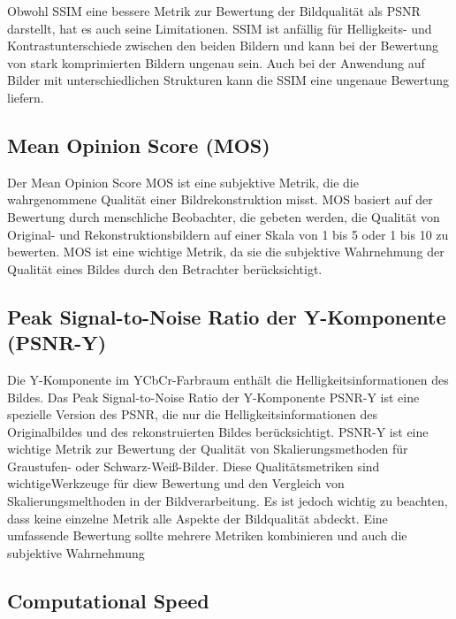             Obwohl \ac{SSIM} eine bessere Metrik zur Bewertung der Bildqualität als \ac{PSNR} darstellt, hat es auch seine Limitationen.
            \ac{SSIM} ist anfällig für Helligkeits- und Kontrastunterschiede zwischen den beiden Bildern und kann bei der Bewertung von stark komprimierten Bildern ungenau sein.
            Auch bei der Anwendung auf Bilder mit unterschiedlichen Strukturen kann die \ac{SSIM} eine ungenaue Bewertung liefern.
    \subsection{Mean Opinion Score (MOS)}
        Der Mean Opinion Score \ac{MOS} ist eine subjektive Metrik, die die wahrgenommene Qualität einer Bildrekonstruktion misst.
        MOS basiert auf der Bewertung durch menschliche Beobachter, die gebeten werden, die Qualität von Original- und Rekonstruktionsbildern auf einer Skala von 1 bis 5 oder 1 bis 10 zu bewerten.
        MOS ist eine wichtige Metrik, da sie die subjektive Wahrnehmung der Qualität eines Bildes durch den Betrachter berücksichtigt.
        
    \subsection{Peak Signal-to-Noise Ratio der Y-Komponente (PSNR-Y)}
        Die Y-Komponente im YCbCr-Farbraum enthält die Helligkeitsinformationen des Bildes. 
        Das Peak Signal-to-Noise Ratio der Y-Komponente \ac{PSNR-Y} ist eine spezielle Version des \ac{PSNR}, die nur die Helligkeitsinformationen des Originalbildes und des rekonstruierten Bildes berücksichtigt.
        \ac{PSNR}-Y ist eine wichtige Metrik zur Bewertung der Qualität von Skalierungsmethoden für Graustufen- oder Schwarz-Weiß-Bilder.
        Diese Qualitätsmetriken sind wichtigeWerkzeuge für diew Bewertung und den Vergleich von Skalierungsmelthoden in der Bildverarbeitung.
        Es ist jedoch wichtig zu beachten, dass keine einzelne Metrik alle Aspekte der Bildqualität abdeckt. Eine umfassende Bewertung sollte mehrere Metriken kombinieren und auch die subjektive Wahrnehmung 
        
    \subsection{Computational Speed}
    

